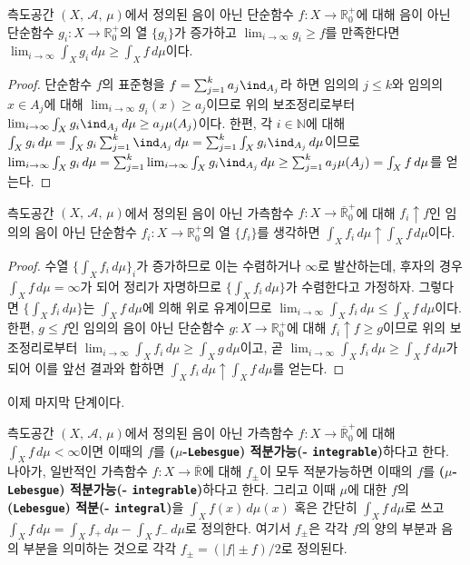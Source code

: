 \begin{lemma}
    측도공간 $(X,\,\mathcal{A},\,\mu)$에서 정의된 음이 아닌 단순함수 $f:X\to\mathbb{R}^+_0$에 대해 음이 아닌 단순함수 $g_i:X\to\mathbb{R}^+_0$의 열 $\{g_i\}$가 증가하고 $\lim_{i\to\infty}g_i\geq f$를 만족한다면 $\lim_{i\to\infty}\int_Xg_i\,d\mu\geq\int_Xf\,d\mu$이다.
\end{lemma}

\begin{proof}
    단순함수 $f$의 표준형을 $f=\sum_{j=1}^ka_j\ind_{A_j}$라 하면 임의의 $j\leq k$와 임의의 $x\in A_j$에 대해 $\lim_{i\to\infty}g_i(x)\geq a_j$이므로 위의 보조정리로부터 $\lim_{i\to\infty}\int_Xg_i\ind_{A_j}\,d\mu\geq a_j\mu(A_j)$이다. 한편, 각 $i\in\mathbb{N}$에 대해 $\int_Xg_i\,d\mu=\int_Xg_i\sum_{j=1}^k\ind_{A_j}\,d\mu=\sum_{j=1}^k\int_Xg_i\ind_{A_j}\,d\mu$이므로 $\lim_{i\to\infty}\int_Xg_i\,d\mu=\sum_{j=1}^k\lim_{i\to\infty}\int_Xg_i\ind_{A_j}\,d\mu\geq\sum_{j=1}^ka_j\mu(A_j)=\int_Xf\,d\mu$를 얻는다.
\end{proof}

\begin{theorem}\label{thm:approxIntegral}
    측도공간 $(X,\,\mathcal{A},\,\mu)$에서 정의된 음이 아닌 가측함수 $f:X\to\overline{\mathbb{R}}^+_0$에 대해 $f_i\uparrow f$인 임의의 음이 아닌 단순함수 $f_i:X\to\mathbb{R}^+_0$의 열 $\{f_i\}$를 생각하면 $\int_Xf_i\,d\mu\uparrow\int_Xf\,d\mu$이다.
\end{theorem}

\begin{proof}
    수열 $\{\int_Xf_i\,d\mu\}_i$가 증가하므로 이는 수렴하거나 $\infty$로 발산하는데, 후자의 경우 $\int_Xf\,d\mu=\infty$가 되어 정리가 자명하므로 $\{\int_Xf_i\,d\mu\}$가 수렴한다고 가정하자. 그렇다면 $\{\int_Xf_i\,d\mu\}$는 $\int_Xf\,d\mu$에 의해 위로 유계이므로 $\lim_{i\to\infty}\int_Xf_i\,d\mu\leq\int_Xf\,d\mu$이다. 한편, $g\leq f$인 임의의 음이 아닌 단순함수 $g:X\to\mathbb{R}^+_0$에 대해 $f_i\uparrow f\geq g$이므로 위의 보조정리로부터 $\lim_{i\to\infty}\int_X f_i\,d\mu\geq\int_Xg\,d\mu$이고, 곧 $\lim_{i\to\infty}\int_X f_i\,d\mu\geq\int_Xf\,d\mu$가 되어 이를 앞선 결과와 합하면 $\int_Xf_i\,d\mu\uparrow\int_Xf\,d\mu$를 얻는다.
\end{proof}

이제 마지막 단계이다.

\begin{definition}\label{def:integral}
    측도공간 $(X,\,\mathcal{A},\,\mu)$에서 정의된 음이 아닌 가측함수 $f:X\to\overline{\mathbb{R}}^+_0$에 대해 $\int_Xf\,d\mu<\infty$이면 이때의 $f$를 \textbf{($\mu$-\texttt{Lebesgue}) 적분가능(- \texttt{integrable})}하다고 한다. 나아가, 일반적인 가측함수 $f:X\to\overline{\mathbb{R}}$에 대해 $f_\pm$이 모두 적분가능하면 이때의 $f$를 \textbf{($\mu$-\texttt{Lebesgue}) 적분가능(- \texttt{integrable})}하다고 한다. 그리고 이때 $\mu$에 대한 $f$의 \textbf{(\texttt{Lebesgue}) 적분(- \texttt{integral})}을 $\int_Xf(x)\,d\mu(x)$ 혹은 간단히 $\int_Xf\,d\mu$로 쓰고 $\int_Xf\,d\mu=\int_Xf_+\,d\mu-\int_Xf_-\,d\mu$로 정의한다. 여기서 $f_\pm$은 각각 $f$의 양의 부분과 음의 부분을 의미하는 것으로 각각 $f_\pm=(|f|\pm f)/2$로 정의된다.
\end{definition}

